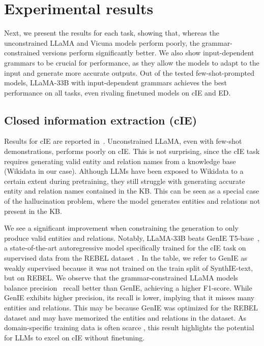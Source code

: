 

\section{Experimental results}\label{subsec:results}

Next, we present the results for each task, showing that, whereas the unconstrained LLaMA and Vicuna models perform poorly, the grammar-constrained versions perform significantly better.
We also show input-dependent grammars to be crucial for performance, as they allow the models to adapt to the input and generate more accurate outputs.
Out of the tested few-shot-prompted models, LLaMA-33B with input-dependent grammars achieves the best performance on all tasks, even rivaling finetuned models on cIE and ED.



\subsection{Closed information extraction (cIE)}\label{subsubsec:closed-information-extraction-cie}

Results for cIE are reported in~.
Unconstrained LLaMA, even with few-shot demonstrations, performs poorly on cIE.
This is not surprising, since the cIE task requires generating valid entity and relation names from a knowledge base (Wikidata in our case).
Although LLMs have been exposed to Wikidata to a certain extent during pretraining, they still struggle with generating accurate entity and relation names contained in the KB.
This can be seen as a special case of the hallucination problem, where the model generates entities and relations not present in the KB.



We see a significant improvement when constraining the generation to only produce valid entities and relations.
Notably, LLaMA-33B beats Gen\-IE T5-base~\cite{josifoski-etal-2022-genie}, a state-of-the-art autoregressive model specifically trained for the cIE task on supervised data from the REBEL dataset~\cite{huguet-cabot-navigli-2021-rebel-relation}.
In the table, we refer to GenIE as weakly supervised because it was not trained on the train split of SynthIE-text, but on REBEL.
We observe that the grammar\hyp constrained LLaMA models balance precision \vs\ recall better than GenIE, achieving a higher F1-score.
While GenIE exhibits higher precision, its recall is lower, implying that it misses many entities and relations.
This may be because GenIE was optimized for the REBEL dataset and may have memorized the entities and relations in the dataset.
%
As domain-specific training data is often scarce \cite{dunn2022structured_UCB}, this result highlights the potential for LLMs to excel on cIE without finetuning.
%


